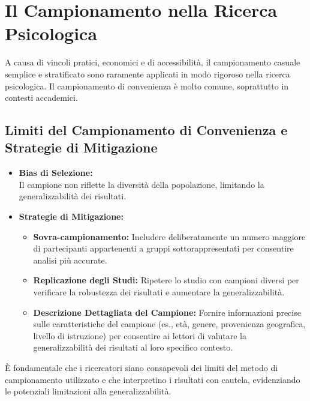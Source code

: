 \documentclass[
  letterpaper,
]{krantz}
\providecommand{\tightlist}{%
  \setlength{\itemsep}{0pt}\setlength{\parskip}{0pt}}\usepackage{longtable,booktabs,array}
\begin{document}
\section{Il Campionamento nella Ricerca
Psicologica}\label{il-campionamento-nella-ricerca-psicologica}

A causa di vincoli pratici, economici e di accessibilità, il
campionamento casuale semplice e stratificato sono raramente applicati
in modo rigoroso nella ricerca psicologica. Il campionamento di
convenienza è molto comune, soprattutto in contesti accademici.

\subsection{Limiti del Campionamento di Convenienza e Strategie di
Mitigazione}\label{limiti-del-campionamento-di-convenienza-e-strategie-di-mitigazione}

\begin{itemize}
\item
  \textbf{Bias di Selezione:}\\
  Il campione non riflette la diversità della popolazione, limitando la
  generalizzabilità dei risultati.
\item
  \textbf{Strategie di Mitigazione:}

  \begin{itemize}
  \tightlist
  \item
    \textbf{Sovra-campionamento:} Includere deliberatamente un numero
    maggiore di partecipanti appartenenti a gruppi sottorappresentati
    per consentire analisi più accurate.
  \item
    \textbf{Replicazione degli Studi:} Ripetere lo studio con campioni
    diversi per verificare la robustezza dei risultati e aumentare la
    generalizzabilità.
  \item
    \textbf{Descrizione Dettagliata del Campione:} Fornire informazioni
    precise sulle caratteristiche del campione (es., età, genere,
    provenienza geografica, livello di istruzione) per consentire ai
    lettori di valutare la generalizzabilità dei risultati al loro
    specifico contesto.
  \end{itemize}
\end{itemize}

È fondamentale che i ricercatori siano consapevoli dei limiti del metodo
di campionamento utilizzato e che interpretino i risultati con cautela,
evidenziando le potenziali limitazioni alla generalizzabilità.
\end{document}
